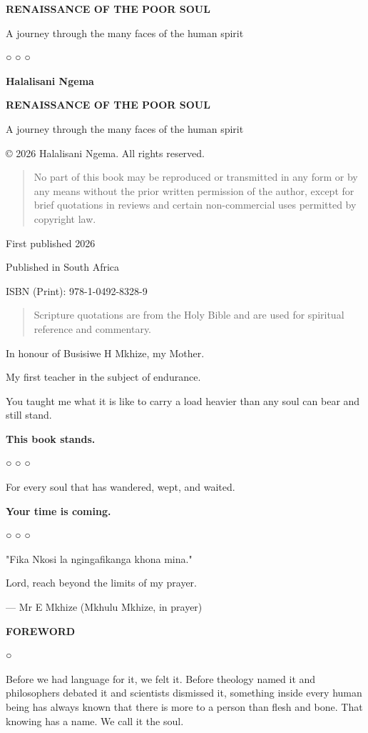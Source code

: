 \textbf{RENAISSANCE OF THE POOR SOUL}

A journey through the many faces of the human spirit

○ ○ ○

\textbf{Halalisani Ngema}

\textbf{RENAISSANCE OF THE POOR SOUL}

A journey through the many faces of the human spirit

© 2026 Halalisani Ngema. All rights reserved.

\begin{quote}
No part of this book may be reproduced or transmitted in any form or by
any means without the prior written permission of the author, except for
brief quotations in reviews and certain non-commercial uses permitted by
copyright law.
\end{quote}

First published 2026

Published in South Africa

ISBN (Print): 978-1-0492-8328-9

\begin{quote}
Scripture quotations are from the Holy Bible and are used for spiritual
reference and commentary.
\end{quote}

In honour of Busisiwe H Mkhize, my Mother.

My first teacher in the subject of endurance.

You taught me what it is like to carry a load heavier than any soul can
bear and still stand.

\textbf{This book stands.}

○ ○ ○

For every soul that has wandered, wept, and waited.

\textbf{Your time is coming.}

○ ○ ○

"Fika Nkosi la ngingafikanga khona mina."

Lord, reach beyond the limits of my prayer.

--- Mr E Mkhize (Mkhulu Mkhize, in prayer)

\textbf{FOREWORD}

○

Before we had language for it, we felt it. Before theology named it and
philosophers debated it and scientists dismissed it, something inside
every human being has always known that there is more to a person than
flesh and bone. That knowing has a name. We call it the soul.

